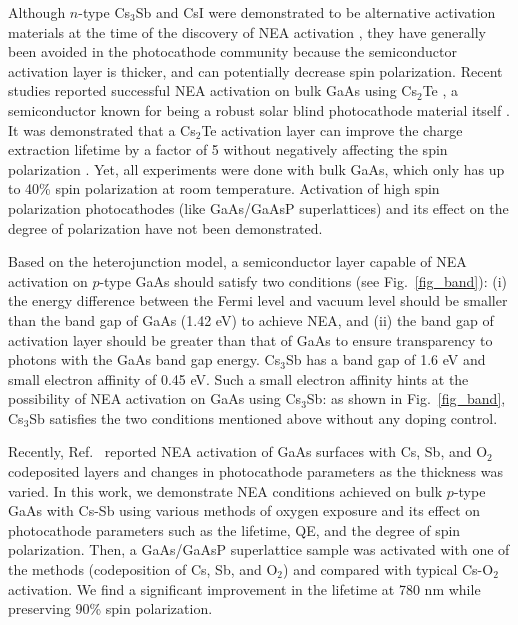Although $n$-type Cs$_3$Sb and CsI were demonstrated to be alternative activation materials at the time of the discovery of NEA activation \cite{sonnenberg1969, sonnenberg1969Cs,hagino1969,zhao1993,guo1996}, they have generally been avoided in the photocathode community because the semiconductor activation layer is thicker, and can potentially decrease spin polarization.
Recent studies reported successful NEA activation on bulk GaAs using Cs$_2$Te \cite{sugiyama2011_StudyElectronAffinity,uchida2014_STUDYROBUSTNESSNEAGAAS,kuriki2015_GaAsPhotocathodeActivation}, a semiconductor known for being a robust solar blind photocathode material itself \cite{michelato2008_Cs2TePHOTOCATHODESROBUSTNESS}. It was demonstrated that a Cs$_2$Te activation layer can improve the charge extraction lifetime by a factor of 5 without negatively affecting the spin polarization \cite{bae2018_RuggedSpinpolarizedElectron}. Yet, all experiments were done with bulk GaAs, which only has up to 40\% spin polarization at room temperature. Activation of high spin polarization photocathodes (like GaAs/GaAsP superlattices) and its effect on the degree of polarization have not been demonstrated.



Based on the heterojunction model, a semiconductor layer capable of NEA activation on $p$-type GaAs should satisfy two conditions (see Fig.~\ref{fig_band}): (i) the energy difference between the Fermi level and vacuum level should be smaller than the band gap of GaAs (1.42 eV) to achieve NEA, and (ii) the band gap of activation layer should be greater than that of GaAs to ensure transparency to photons with the GaAs band gap energy.
Cs$_3$Sb has a band gap of 1.6 eV and small electron affinity of 0.45 eV.
Such a small electron affinity hints at the possibility of NEA activation on GaAs using Cs$_3$Sb: as shown in Fig.~\ref{fig_band}, Cs$_3$Sb satisfies the two conditions mentioned above without any doping control. %

Recently, Ref.~\cite{cultrera2020_LongLifetimePolarized} reported NEA activation of GaAs surfaces with Cs, Sb, and O$_2$ codeposited layers and changes in photocathode parameters as the thickness was varied.
In this work, we demonstrate NEA conditions achieved on bulk $p$-type GaAs with Cs-Sb using various methods of oxygen exposure and its effect on photocathode parameters such as the lifetime, QE, and the degree of spin polarization.
Then, a GaAs/GaAsP superlattice sample was activated with one of the methods (codeposition of Cs, Sb, and O$_2$) and compared with typical Cs-O$_2$ activation. We find a significant improvement in the lifetime at 780 nm while preserving 90\% spin polarization.

